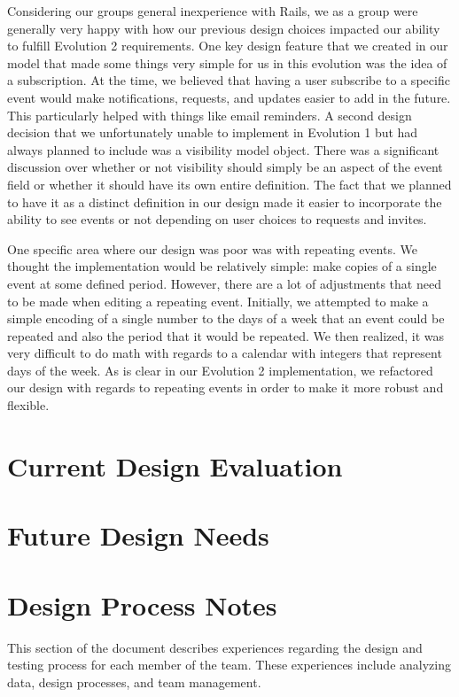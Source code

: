 \documentclass[11pt]{article}
\begin{document}
Considering our groups general inexperience with Rails, we as a group were generally very happy with how our previous design choices impacted our ability to fulfill Evolution 2 requirements.  One key design feature that we created in our model that made some things very simple for us in this evolution was the idea of a subscription.  At the time, we believed that having a user subscribe to a specific event would make notifications, requests, and updates easier to add in the future.  This particularly helped with things like email reminders.  A second design decision that we unfortunately unable to implement in Evolution 1 but had always planned to include was a visibility model object.  There was a significant discussion over whether or not visibility should simply be an aspect of the event field or whether it should have its own entire definition.  The fact that we planned to have it as a distinct definition in our design made it easier to incorporate the ability to see events or not depending on user choices to requests and invites.

One specific area where our design was poor was with repeating events.  We thought the implementation would be relatively simple: make copies of a single event at some defined period.  However, there are a lot of adjustments that need to be made when editing a repeating event.  Initially, we attempted to make a simple encoding of a single number to the days of a week that an event could be repeated and also the period that it would be repeated.  We then realized, it was very difficult to do math with regards to a calendar with integers that represent days of the week.  As is clear in our Evolution 2 implementation, we refactored our design with regards to repeating events in order to make it more robust and flexible.

\section{Current Design Evaluation}

\section{Future Design Needs}

\section{Design Process Notes}

This section of the document describes experiences regarding the design and testing process for each member of the team.  These experiences include analyzing data, design processes, and team management.
\end{document}
